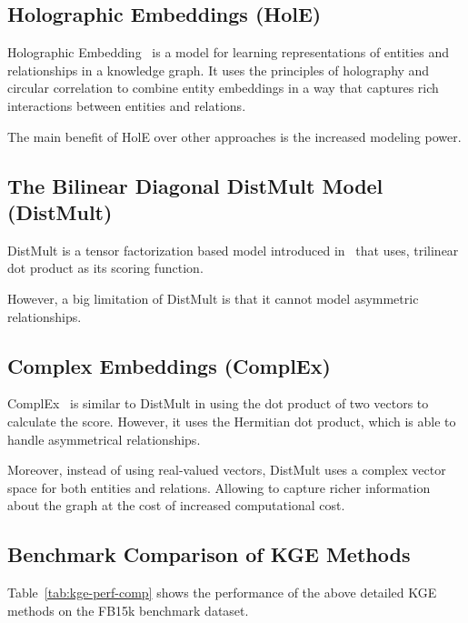 \FloatBarrier


\subsection{Holographic Embeddings (HolE)}

Holographic Embedding~\cite{HolE} is a model for learning representations of entities and relationships in a knowledge graph.
It uses the principles of holography and circular correlation to combine entity embeddings in a way that captures rich
interactions between entities and relations.

The main benefit of HolE over other approaches is the increased modeling power.

\subsection{The Bilinear Diagonal DistMult Model (DistMult)}

DistMult is a tensor factorization based model introduced in~\cite{DistMult} that uses,
trilinear dot product as its scoring function.

However, a big limitation of DistMult is that it cannot model asymmetric relationships.

\subsection{Complex Embeddings (ComplEx)}

ComplEx~\cite{ComplEx} is similar to DistMult in using the dot product of two vectors to calculate the score.
However, it uses the Hermitian dot product, which is able to handle asymmetrical relationships.

Moreover, instead of using real-valued vectors, DistMult uses a complex vector space for both entities and relations.
Allowing to capture richer information about the graph at the cost of increased computational cost.

\subsection{Benchmark Comparison of KGE Methods}
Table~\ref{tab:kge-perf-comp} shows the performance of the above detailed KGE methods on the FB15k benchmark dataset.


